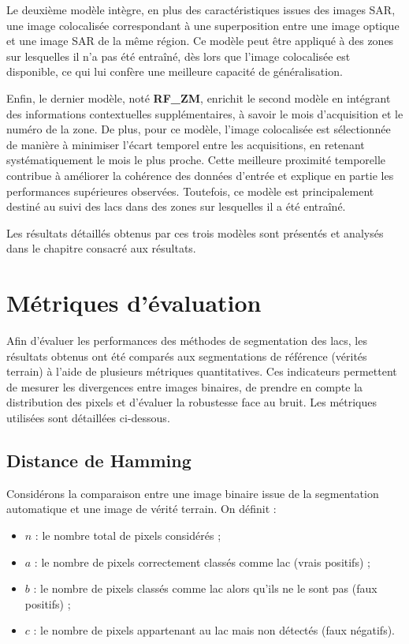 \documentclass[11pt,a4paper]{article}
\begin{document}
Le deuxième modèle intègre, en plus des caractéristiques issues des images SAR, une image colocalisée correspondant à une superposition entre une image optique et une image SAR de la même région. Ce modèle peut être appliqué à des zones sur lesquelles il n’a pas été entraîné, dès lors que l’image colocalisée est disponible, ce qui lui confère une meilleure capacité de généralisation.

Enfin, le dernier modèle, noté \textbf{RF\_ZM}, enrichit le second modèle en intégrant des informations contextuelles supplémentaires, à savoir le mois d’acquisition et le numéro de la zone. De plus, pour ce modèle, l’image colocalisée est sélectionnée de manière à minimiser l’écart temporel entre les acquisitions, en retenant systématiquement le mois le plus proche. Cette meilleure proximité temporelle contribue à améliorer la cohérence des données d’entrée et explique en partie les performances supérieures observées. Toutefois, ce modèle est principalement destiné au suivi des lacs dans des zones sur lesquelles il a été entraîné.

Les résultats détaillés obtenus par ces trois modèles sont présentés et analysés dans le chapitre consacré aux résultats.

\section{Métriques d’évaluation}

Afin d’évaluer les performances des méthodes de segmentation des lacs, les résultats obtenus ont été comparés aux segmentations de référence (vérités terrain) à l’aide de plusieurs métriques quantitatives. Ces indicateurs permettent de mesurer les divergences entre images binaires, de prendre en compte la distribution des pixels et d’évaluer la robustesse face au bruit. Les métriques utilisées sont détaillées ci-dessous.

\subsection{Distance de Hamming}

Considérons la comparaison entre une image binaire issue de la segmentation automatique et une image de vérité terrain. On définit :

\begin{itemize}
    \item $n$ : le nombre total de pixels considérés ;
    \item $a$ : le nombre de pixels correctement classés comme lac (vrais positifs) ;
    \item $b$ : le nombre de pixels classés comme lac alors qu’ils ne le sont pas (faux positifs) ;
    \item $c$ : le nombre de pixels appartenant au lac mais non détectés (faux négatifs).
\end{itemize}
\end{document}

